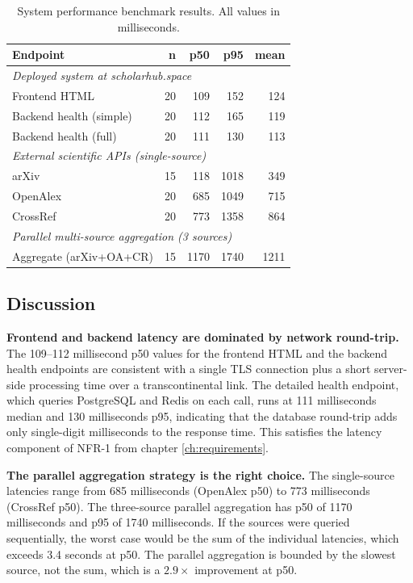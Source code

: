 \begin{table}[h]
\centering
\caption{System performance benchmark results. All values in milliseconds.}
\label{tab:perf-results}
\small
\begin{tabularx}{\textwidth}{X r r r r}
\toprule
\textbf{Endpoint} & \textbf{n} & \textbf{p50} & \textbf{p95} & \textbf{mean} \\
\midrule
\multicolumn{5}{l}{\textit{Deployed system at scholarhub.space}} \\
Frontend HTML            & 20 & 109  & 152  & 124 \\
Backend health (simple)  & 20 & 112  & 165  & 119 \\
Backend health (full)    & 20 & 111  & 130  & 113 \\
\midrule
\multicolumn{5}{l}{\textit{External scientific APIs (single-source)}} \\
arXiv                    & 15 & 118  & 1018 & 349 \\
OpenAlex                 & 20 & 685  & 1049 & 715 \\
CrossRef                 & 20 & 773  & 1358 & 864 \\
\midrule
\multicolumn{5}{l}{\textit{Parallel multi-source aggregation (3 sources)}} \\
Aggregate (arXiv+OA+CR)  & 15 & 1170 & 1740 & 1211 \\
\bottomrule
\end{tabularx}
\end{table}

\subsection{Discussion}

\textbf{Frontend and backend latency are dominated by network round-trip.} The 109--112 millisecond p50 values for the frontend HTML and the backend health endpoints are consistent with a single TLS connection plus a short server-side processing time over a transcontinental link. The detailed health endpoint, which queries PostgreSQL and Redis on each call, runs at 111 milliseconds median and 130 milliseconds p95, indicating that the database round-trip adds only single-digit milliseconds to the response time. This satisfies the latency component of NFR-1 from chapter \ref{ch:requirements}.

\textbf{The parallel aggregation strategy is the right choice.} The single-source latencies range from 685 milliseconds (OpenAlex p50) to 773 milliseconds (CrossRef p50). The three-source parallel aggregation has p50 of 1170 milliseconds and p95 of 1740 milliseconds. If the sources were queried sequentially, the worst case would be the sum of the individual latencies, which exceeds 3.4 seconds at p50. The parallel aggregation is bounded by the slowest source, not the sum, which is a $2.9\times$ improvement at p50.

